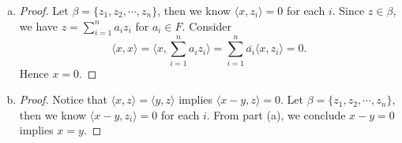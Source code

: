 \begin{Exercise}
	\begin{enumerate}[(a)]
		\item
		\begin{proof}
			Let $\beta = \{z_1,z_2,\cdots, z_n\}$, then we know $\langle x, z_i \rangle = 0$ for each $i$. Since $z\in \beta$, we have $z = \sum_{i=1}^{n} a_i z_i$ for $a_i \in F$. Consider
			$$
			\langle x,x \rangle
			= \langle x, \sum_{i=1}^{n} a_i z_i \rangle
			= \sum_{i=1}^{n} \overline{a_i} \langle x, z_i \rangle
			= 0.
			$$
			Hence $x=0$.
		\end{proof}
		
		\item
		\begin{proof}
			Notice that $\langle x,z \rangle = \langle y,z \rangle$ implies $\langle x-y, z \rangle = 0$. Let $\beta = \{z_1,z_2,\cdots, z_n\}$, then we know $\langle x-y, z_i \rangle = 0$ for each $i$. From part (a), we conclude $x-y=0$ implies $x=y$.
		\end{proof}
	\end{enumerate}
\end{Exercise}